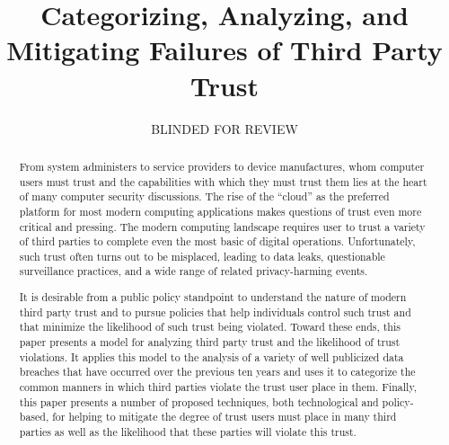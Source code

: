 \documentclass[11pt,letterpaper]{article}
\begin{document}
\title{Categorizing, Analyzing, and Mitigating Failures of Third Party Trust}

\author{BLINDED FOR REVIEW}

\date{}

\maketitle

\begin{abstract}

From system administers to service providers to device manufactures,
whom computer users must trust and the capabilities with which they
must trust them lies at the heart of many computer security
discussions. The rise of the ``cloud'' as the preferred platform for
most modern computing applications makes questions of trust even more
critical and pressing. The modern computing landscape requires user to
trust a variety of third parties to complete even the most basic of
digital operations. Unfortunately, such trust often turns out to be
misplaced, leading to data leaks, questionable surveillance practices,
and a wide range of related privacy-harming events.

It is desirable from a public policy standpoint to understand the
nature of modern third party trust and to pursue policies that help
individuals control such trust and that minimize the likelihood of
such trust being violated. Toward these ends, this paper presents a
model for analyzing third party trust and the likelihood of trust
violations. It applies this model to the analysis of a variety of well
publicized data breaches that have occurred over the previous ten
years and uses it to categorize the common manners in which third
parties violate the trust user place in them. Finally, this paper
presents a number of proposed techniques, both technological and
policy-based, for helping to mitigate the degree of trust users must
place in many third parties as well as the likelihood that these
parties will violate this trust.

\end{abstract}









\end{document}
